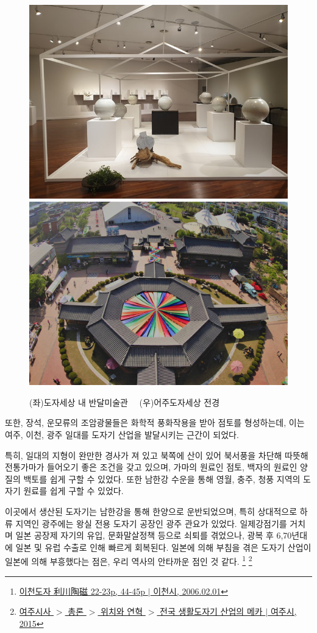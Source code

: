  \begin{figure}[ht]
    \centering
    \includegraphics[width=.4\textwidth]{img/도자전.jpg}
    \includegraphics[width=.4\textwidth]{img/여주도자세상.jpg}
    \caption{(좌)도자세상 내 반달미술관\protect\footnotemark $\quad$ (우)어주도자세상 전경\protect\footnotemark}
    \label{fig:my_labe3}
\end{figure}

또한, 장석, 운모류의 조암광물들은 화학적 풍화작용을 받아 점토를 형성하는데,
이는  여주, 이천, 광주 일대를 도자기 산업을 발달시키는 근간이 되었다.

특히, 일대의 지형이 완만한 경사가 져 있고
북쪽에 산이 있어 북서풍을 차단해 따뜻해 전통가마가 들어오기 좋은 조건을 갖고 있으며,
가마의 원료인 점토, 백자의 원료인 양질의 백토를 쉽게 구할 수 있었다.
또한 남한강 수운을 통해 영월, 충주, 청풍 지역의 도자기 원료를 쉽게 구할 수 있었다.

이곳에서 생산된 도자기는 남한강을 통해 한양으로 운반되었으며,
특히 상대적으로 하류 지역인 광주에는 왕실 전용 도자기 공장인 광주 관요가 있었다.
일제강점기를 거치며 일본 공장제 자기의 유입, 문화말살정책 등으로 쇠퇴를 겪었으나,
광복 후 6,70년대에 일본 및 유럽 수출로 인해 빠르게 회복된다.
일본에 의해 부침을 겪은 도자기 산업이 일본에 의해 부흥했다는 점은, 우리 역사의 안타까운 점인 것 같다.
\footnote{\href{https://memory.library.kr/items/show/37951}{이천도자 利川陶磁 22-23p, 44-45p $|$ 이천시, 2006.02.01}}
\footnote{ \href{https://www.yeoju.go.kr/history/main.jsp}{여주시사 $>$ 총론 $>$ 위치와 연혁 $>$ 전국 생활도자기 산업의 메카 $|$ 여주시, 2015}}

